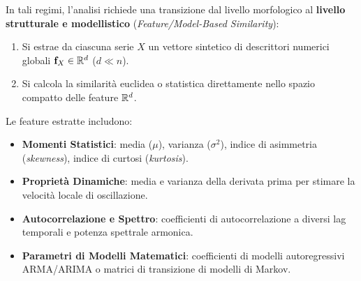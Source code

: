 In tali regimi, l'analisi richiede una transizione dal livello morfologico al \textbf{livello strutturale e modellistico} (\textit{Feature/Model-Based Similarity}):
\begin{enumerate}
    \item Si estrae da ciascuna serie $X$ un vettore sintetico di descrittori numerici globali $\mathbf{f}_X \in \mathbb{R}^d$ ($d \ll n$).
    \item Si calcola la similarit\`a euclidea o statistica direttamente nello spazio compatto delle feature $\mathbb{R}^d$.
\end{enumerate}

Le feature estratte includono:
\begin{itemize}
    \item \textbf{Momenti Statistici}: media ($\mu$), varianza ($\sigma^2$), indice di asimmetria (\textit{skewness}), indice di curtosi (\textit{kurtosis}).
    \item \textbf{Propriet\`a Dinamiche}: media e varianza della derivata prima per stimare la velocit\`a locale di oscillazione.
    \item \textbf{Autocorrelazione e Spettro}: coefficienti di autocorrelazione a diversi lag temporali e potenza spettrale armonica.
    \item \textbf{Parametri di Modelli Matematici}: coefficienti di modelli autoregressivi ARMA/ARIMA o matrici di transizione di modelli di Markov.
\end{itemize}

